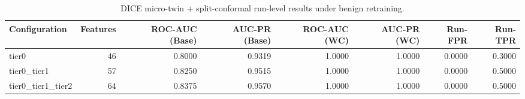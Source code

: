 \begin{table}[t]
\centering
\caption{DICE micro-twin + split-conformal run-level results under benign retraining.}
\label{tab:dice_full_overall}
\footnotesize
\begin{tabular}{lrrrrrrr}
\toprule
Configuration & Features & ROC-AUC (Base) & AUC-PR (Base) & ROC-AUC (WC) & AUC-PR (WC) & Run-FPR & Run-TPR \\
\midrule
tier0 & 46 & 0.8000 & 0.9319 & 1.0000 & 1.0000 & 0.0000 & 0.3000 \\
tier0_tier1 & 57 & 0.8250 & 0.9515 & 1.0000 & 1.0000 & 0.0000 & 0.5000 \\
tier0_tier1_tier2 & 64 & 0.8375 & 0.9570 & 1.0000 & 1.0000 & 0.0000 & 0.5000 \\
\bottomrule
\end{tabular}

\end{table}
